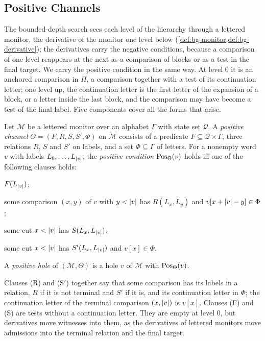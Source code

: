 \subsection{Positive Channels}\label{sec:mo-channels}

The bounded-depth search sees each level of the hierarchy through a lettered
monitor, the derivative of the monitor one level below
(\cref{def:bg-monitor,def:bg-derivative}); the derivatives carry the negative
conditions, because a comparison of one level reappears at the next as a
comparison of blocks or as a test in the final target. We carry the positive
condition in the same way. At level $0$ it is an anchored comparison in $\Pi$,
a comparison together with a test of its continuation letter; one level up, the
continuation letter is the first letter of the expansion of a block, or a
letter inside the last block, and the comparison may have become a test of the
final label. Five components cover all the forms that arise.

\begin{definition}\label{def:mo-channel}
Let $\mathcal M$ be a lettered monitor over an alphabet $\Gamma$ with state set
$\mathcal Q$. A \emph{positive channel} $\Theta=(F,R,S,S',\Phi)$ on $\mathcal M$
consists of a predicate $F\subseteq\mathcal Q\times\Gamma$, three relations
$R$, $S$ and $S'$ on labels, and a set $\Phi\subseteq\Gamma$ of letters. For a
nonempty word $v$ with labels $L_0,\ldots,L_{\lvert v\rvert}$, the \emph{positive
condition} $\operatorname{Pos}_\Theta(v)$ holds iff one of the following clauses holds:
\begin{description}[leftmargin=2.8em,font=\normalfont]
\item[(F)] $F(L_{\lvert v\rvert})$;
\item[(R)] some comparison $(x,y)$ of $v$ with $y<\lvert v\rvert$ has $R(L_x,L_y)$ and
  $v[x+\lvert v\rvert-y]\in\Phi$;
\item[(S)] some cut $x<\lvert v\rvert$ has $S(L_x,L_{\lvert v\rvert})$;
\item[(S$'$)] some cut $x<\lvert v\rvert$ has $S'(L_x,L_{\lvert v\rvert})$ and $v[x]\in\Phi$.
\end{description}
A \emph{positive hole} of $(\mathcal M,\Theta)$ is a hole $v$ of $\mathcal M$
with $\operatorname{Pos}_\Theta(v)$.
\end{definition}

Clauses (R) and (S$'$) together say that some comparison has its labels in a
relation, $R$ if it is not terminal and $S'$ if it is, and its continuation
letter in $\Phi$; the continuation letter of the terminal comparison $(x,\lvert v\rvert)$ is $v[x]$. Clauses (F) and (S) are tests without a continuation letter.
They are empty at level $0$, but derivatives move witnesses into them, as the
derivatives of lettered monitors move admissions into the terminal relation and the
final target.

